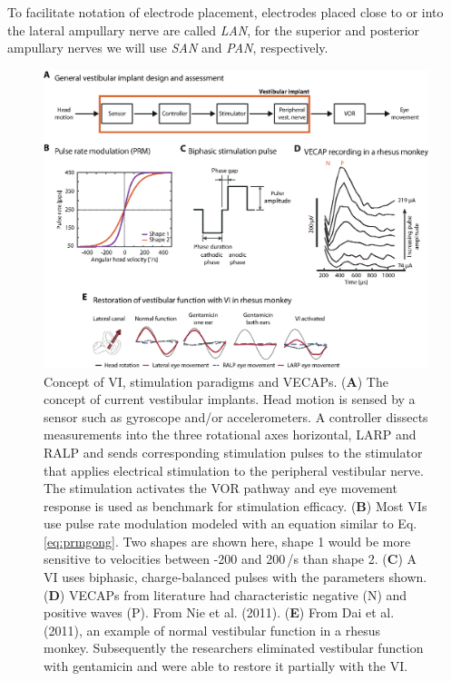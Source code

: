 To facilitate notation of electrode placement, electrodes placed close to or into the lateral ampullary nerve are called \emph{LAN}, for the superior and posterior ampullary nerves we will use \emph{SAN} and \emph{PAN}, respectively.
\begin{figure}[btp]
\centering
\includegraphics[width=.95\textwidth]{chapters/background/figures/Fig_VIconcept_v2.eps} 
\caption[Concept of vestibular implant]{Concept of VI, stimulation paradigms and VECAPs. (\textbf{A}) The concept of current vestibular implants. Head motion is sensed by a sensor such as gyroscope and/or accelerometers. A controller dissects measurements into the three rotational axes horizontal, LARP and RALP and sends corresponding stimulation pulses to the stimulator that applies electrical stimulation to the peripheral vestibular nerve. The stimulation activates the VOR pathway and eye movement response is used as benchmark for stimulation efficacy. (\textbf{B}) Most VIs use pulse rate modulation modeled with an equation similar to Eq.\,\ref{eq:prmgong}. Two shapes are shown here, shape 1 would be more sensitive to velocities between -200 and 200\,\degree /s than shape 2. (\textbf{C}) A VI uses biphasic, charge-balanced pulses with the parameters shown. (\textbf{D}) VECAPs from literature had characteristic negative (N) and positive waves (P). From Nie et al. (2011). (\textbf{E}) From Dai et al. (2011), an example of normal vestibular function in a rhesus monkey. Subsequently the researchers eliminated vestibular function with gentamicin and were able to restore it partially with the VI.
}
\label{fig:viconcept}
\end{figure}

